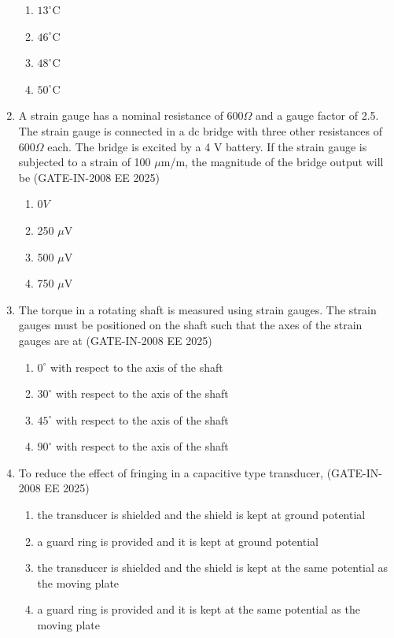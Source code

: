 \documentclass[journal,12pt,onecolumn]{IEEEtran}
\theoremstyle{remark}
\begin{document}
\begin{enumerate}[label=Q.\arabic*,start=1]
    \begin{enumerate} 
        \item  $13^{\circ}$C
        \item  $46^{\circ}$C
        \item  $48^{\circ}$C
        \item  $50^{\circ}$C
    \end{enumerate}
    
    \item A strain gauge has a nominal resistance of 600$\Omega$ and a gauge factor of 2.5. The strain gauge is
connected in a dc bridge with three other resistances of 600$\Omega$ each. The bridge is excited by a 4 V
battery. If the strain gauge is subjected to a strain of 100 $\mu$m/m, the magnitude of the bridge output will be (GATE-IN-2008 EE 2025)

    \begin{enumerate} 
        \item  $0 V$
        \item  250 $\mu$V
        \item  500 $\mu$V
        \item  750 $\mu$V
    \end{enumerate}
    
    \item The torque in a rotating shaft is measured using strain gauges. The strain gauges must be positioned
on the shaft such that the axes of the strain gauges are at (GATE-IN-2008 EE 2025)
    \begin{enumerate} 
        \item  $0^{\circ}$ with respect to the axis of the shaft 
        \item  $30^{\circ}$ with respect to the axis of the shaft
        \item  $45^{\circ}$ with respect to the axis of the shaft
        \item  $90^{\circ}$ with respect to the axis of the shaft
    \end{enumerate}
    
    \item To reduce the effect of fringing in a capacitive type transducer, (GATE-IN-2008 EE 2025)
    \begin{enumerate} 
        \item  the transducer is shielded and the shield is kept at ground potential  
        \item  a guard ring is provided and it is kept at ground potential  
        \item   the transducer is shielded and the shield is kept at the same potential as the moving plate
        \item a guard ring is provided and it is kept at the same potential as the moving plate
    \end{enumerate}


\end{enumerate}
\end{document}
